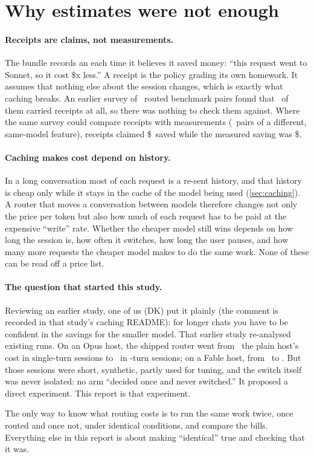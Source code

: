 \section{Why estimates were not enough}\label{sec:why}

\paragraph{Receipts are claims, not measurements.} The bundle records an  each time
it believes it saved money: ``this request went to Sonnet, so it cost \$x less.'' A receipt is the
policy grading its own homework. It assumes that nothing else about the session changes, which is exactly
what caching breaks. An earlier survey of \SurveyRoutedPairs\ routed benchmark pairs found that
\SurveyReceipts\ of them carried receipts at all, so there was nothing to check them against. Where the same
survey could compare receipts with measurements (\SurveyRcptPairs\ pairs of a different, same-model
feature), receipts claimed \$\SurveyRcptClaimed\ saved while the measured saving was \$\SurveyRcptMeasured.

\paragraph{Caching makes cost depend on history.} In a long conversation most of each request is a
re-sent history, and that history is cheap only while it stays in the cache of the model being used
(\cref{sec:caching}). A router that moves a conversation between models therefore changes not only the
price per token but also how much of each request has to be paid at the expensive ``write'' rate. Whether
the cheaper model still wins depends on how long the session is, how often it switches, how long the user
pauses, and how many more requests the cheaper model makes to do the same work. None of these can be read
off a price list.

\paragraph{The question that started this study.} Reviewing an earlier study, one of us (DK) put it plainly
(the comment is recorded in that study's caching README): for longer chats you have to be confident in the
savings for the smaller model. That earlier study re-analysed
existing runs. On an Opus host, the shipped router went from \SurveyOpusOne\X\ the plain host's cost in
single-turn sessions to \SurveyOpusFour\X\ in \SurveyTurns-turn sessions; on a Fable host, from
\SurveyFableOne\X\ to \SurveyFableFour\X. But those sessions were short, synthetic, partly used for tuning,
and the switch itself was never isolated: no arm ``decided once and never switched.'' It proposed a direct
experiment. This report is that experiment.

\begin{keyidea}
The only way to know what routing costs is to run the same work twice, once routed and once not, under
identical conditions, and compare the bills. Everything else in this report is about making ``identical''
true and checking that it was.
\end{keyidea}
